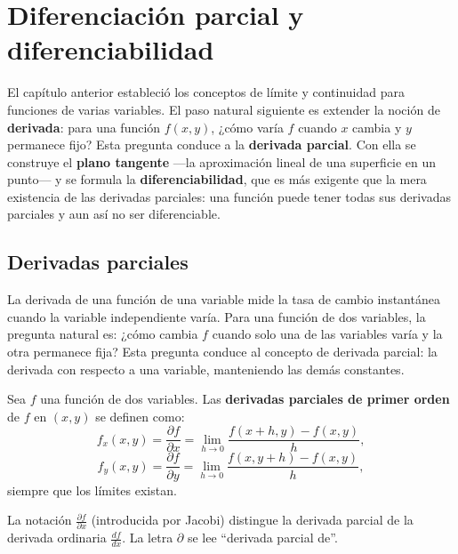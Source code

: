 
\chapter{Diferenciación parcial y diferenciabilidad}

El capítulo anterior estableció los conceptos de límite y continuidad para
funciones de varias variables. El paso natural siguiente es extender la
noción de \textbf{derivada}: para una función $f(x,y)$, ¿cómo varía $f$
cuando $x$ cambia y $y$ permanece fijo? Esta pregunta conduce a la
\textbf{derivada parcial}. Con ella se construye el \textbf{plano tangente}
—la aproximación lineal de una superficie en un punto— y se formula la
\textbf{diferenciabilidad}, que es más exigente que la mera existencia de
las derivadas parciales: una función puede tener todas sus derivadas
parciales y aun así no ser diferenciable.


\section{Derivadas parciales}

La derivada de una función de una variable mide la tasa de cambio
instantánea cuando la variable independiente varía. Para una función
de dos variables, la pregunta natural es: ¿cómo cambia $f$ cuando
solo una de las variables varía y la otra permanece fija? Esta
pregunta conduce al concepto de derivada parcial: la derivada con
respecto a una variable, manteniendo las demás constantes.

\begin{definition}
Sea $f$ una función de dos variables. Las \textbf{derivadas parciales
de primer orden} de $f$ en $(x,y)$ se definen como:
\[
f_x(x,y) = \frac{\partial f}{\partial x}
= \lim_{h\to 0} \frac{f(x+h,y)-f(x,y)}{h},
\]
\[
f_y(x,y) = \frac{\partial f}{\partial y}
= \lim_{h\to 0} \frac{f(x,y+h)-f(x,y)}{h},
\]
siempre que los límites existan.
\end{definition}

La notación $\frac{\partial f}{\partial x}$ (introducida por
Jacobi) distingue la derivada parcial de la derivada ordinaria
$\frac{df}{dx}$. La letra $\partial$ se lee ``derivada parcial de''.

